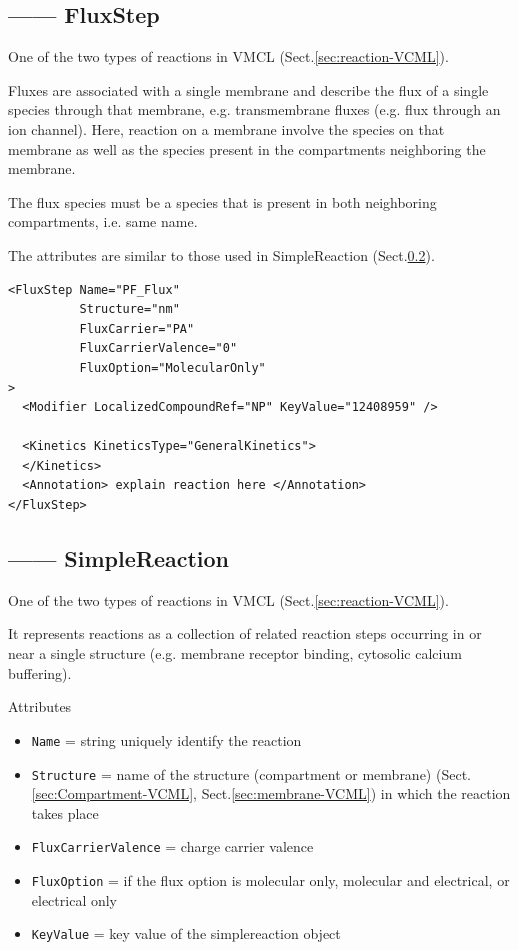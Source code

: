 \subsection{------ FluxStep}
\label{sec:FluxStep-VMCL}

One of the two types of reactions in VMCL (Sect.\ref{sec:reaction-VCML}).

Fluxes are associated with a single membrane and describe the flux of a single
species through that membrane, e.g. transmembrane fluxes (e.g. flux through an
ion channel). Here,  reaction on a membrane involve the species on that membrane
as well as the species present in the compartments neighboring the membrane.

The flux species must be a species that is present in both neighboring
compartments, i.e. same name.

The attributes are similar to those used in SimpleReaction
(Sect.\ref{sec:SimpleReaction-VMCL}).

\begin{verbatim}
<FluxStep Name="PF_Flux"
          Structure="nm"
          FluxCarrier="PA"
          FluxCarrierValence="0"
          FluxOption="MolecularOnly"
>
  <Modifier LocalizedCompoundRef="NP" KeyValue="12408959" />
  
  <Kinetics KineticsType="GeneralKinetics">
  </Kinetics>
  <Annotation> explain reaction here </Annotation>
</FluxStep>
\end{verbatim}

\subsection{------ SimpleReaction}
\label{sec:SimpleReaction-VMCL}

One of the two types of reactions in VMCL (Sect.\ref{sec:reaction-VCML}).

It represents reactions as a collection of related reaction steps occurring in
or near a single structure (e.g. membrane receptor binding, cytosolic calcium
buffering).

Attributes
\begin{itemize}
  \item \verb!Name! = string uniquely identify the reaction
  \item \verb!Structure! = name of the structure (compartment or membrane)
  (Sect.\ref{sec:Compartment-VCML}, Sect.\ref{sec:membrane-VCML})  in which the
  reaction takes place
  
  \item \verb!FluxCarrierValence! = charge carrier valence
  
  \item \verb!FluxOption! = if the flux option is molecular 
only, molecular and electrical, or electrical only

  \item \verb!KeyValue! = key value of the simplereaction object
\end{itemize}

